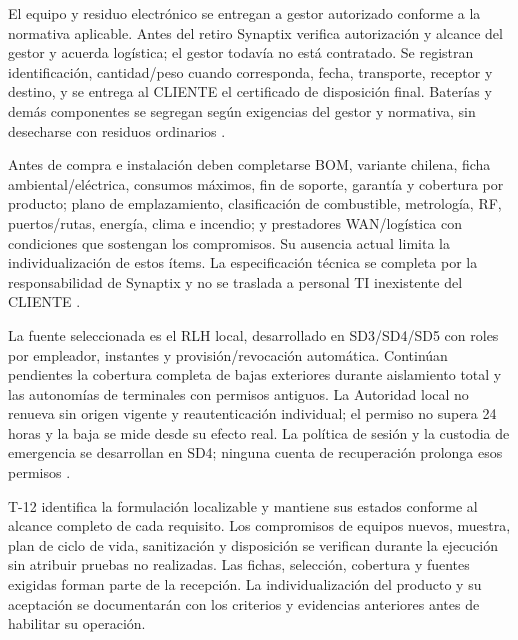 El equipo y residuo electrónico se entregan a gestor autorizado conforme a la normativa aplicable. Antes del retiro Synaptix verifica autorización y alcance del gestor y acuerda logística; el gestor todavía no está contratado. Se registran identificación, cantidad/peso cuando corresponda, fecha, transporte, receptor y destino, y se entrega al CLIENTE el certificado de disposición final. Baterías y demás componentes se segregan según exigencias del gestor y normativa, sin desecharse con residuos ordinarios \parencite[RT-08.18, p.~20]{pucv-transversal}.

Antes de compra e instalación deben completarse BOM, variante chilena, ficha ambiental/eléctrica, consumos máximos, fin de soporte, garantía y cobertura por producto; plano de emplazamiento, clasificación de combustible, metrología, RF, puertos/rutas, energía, clima e incendio; y prestadores WAN/logística con condiciones que sostengan los compromisos. Su ausencia actual limita la individualización de estos ítems. La especificación técnica se completa por la responsabilidad de Synaptix y no se traslada a personal TI inexistente del CLIENTE \parencites[RT-08.01/04/10/13, pp.~18--19]{pucv-transversal}[cap.~11; cap.~17, secc.~17.4]{caso07}.

La fuente seleccionada es el RLH local, desarrollado en SD3/SD4/SD5 con roles por empleador, instantes y provisión/revocación automática. Continúan pendientes la cobertura completa de bajas exteriores durante aislamiento total y las autonomías de terminales con permisos antiguos. La Autoridad local no renueva sin origen vigente y reautenticación individual; el permiso no supera 24 horas y la baja se mide desde su efecto real. La política de sesión y la custodia de emergencia se desarrollan en SD4; ninguna cuenta de recuperación prolonga esos permisos \parencites[RT-12.10/13, p.~26]{pucv-transversal}[cap.~15, RT-03.10/13]{caso07}.

T-12 identifica la formulación localizable y mantiene sus estados conforme al alcance completo de cada requisito. Los compromisos de equipos nuevos, muestra, plan de ciclo de vida, sanitización y disposición se verifican durante la ejecución sin atribuir pruebas no realizadas. Las fichas, selección, cobertura y fuentes exigidas forman parte de la recepción. La individualización del producto y su aceptación se documentarán con los criterios y evidencias anteriores antes de habilitar su operación.

